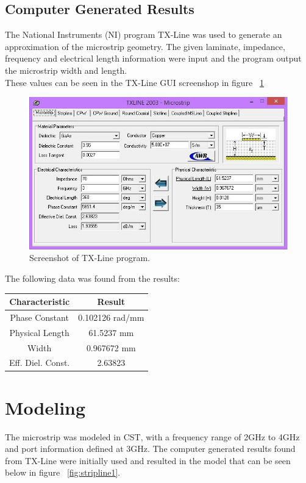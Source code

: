 \documentclass{paper}
\begin{document}
\subsection{Computer Generated Results}
\label{sec:tx-line}
The National Instruments (NI) program TX-Line was used to generate an approximation of the microstrip geometry. The given laminate, impedance, frequency and electrical length information were input and the program output the microstrip width and length. \\

These values can be seen in the TX-Line GUI screenshop in figure ~\ref{fig:txline}  

\begin{figure}[H]
	\centering
	\includegraphics[scale=0.6]{IMG/txline}
	\caption{Screenshot of TX-Line program.}
	\label{fig:txline}
\end{figure}

The following data was found from the results:

\begin{center}
	\begin{tabular}{c|c}
		\hline
		Characteristic & Result\\\hline\hline
		Phase Constant & 0.102126 rad/mm\\\hline
		Physical Length & 61.5237 mm\\	\hline
		Width & 0.967672 mm\\\hline
		Eff. Diel. Const. & 2.63823\\\hline
	\end{tabular}
\end{center}

\newpage
\section{Modeling}
\label{sec:CST}
The microstrip was modeled in CST, with a frequency range of 2GHz to 4GHz and port information defined at 3GHz. The computer generated results found from TX-Line were initially used and resulted in the model that can be seen below in figure ~\ref{fig:stripline1}.\\
\end{document}
